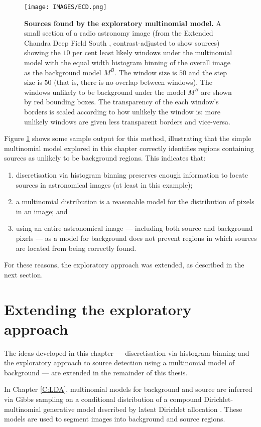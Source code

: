 \begin{figure}
\centering
\texttt{[image: IMAGES/ECD.png]}
\caption[Sources found by the exploratory multinomial model]{\textbf{Sources found by the exploratory multinomial model.} A small section of a radio astronomy image (from the Extended Chandra Deep Field South \cite{miller2013very}, contrast-adjusted to show sources) showing the $10$ per cent least likely windows under the multinomial model with the equal width histogram binning of the overall image as the background model $M^B$. The window size is $50$ and the step size is $50$ (that is, there is no overlap between windows). The windows unlikely to be background under the model $M^B$ are shown by red bounding boxes. The transparency of the each window's borders is scaled according to how unlikely the window is: more unlikely windows are given less transparent borders and vice-versa.}
\label{fig:ECD-mult}
\end{figure}

Figure \ref{fig:ECD-mult} shows some sample output for this method, illustrating that the simple multinomial model explored in this chapter correctly identifies regions containing sources as unlikely to be background regions. This indicates that:
\begin{enumerate}
\item discretisation via histogram binning preserves enough information to locate sources in astronomical images (at least in this example);
\item a multinomial distribution is a reasonable model for the distribution of pixels in an image; and
\item using an entire astronomical image --- including both source and background pixels --- as a model for background does not prevent regions in which sources are located from being correctly found.
\end{enumerate}

For these reasons, the exploratory approach was extended, as described in the next section.

\section{Extending the exploratory approach}
The ideas developed in this chapter --- discretisation via histogram binning and the exploratory approach to source detection using a multinomial model of background --- are extended in the remainder of this thesis. 

In Chapter \ref{C:LDA}, multinomial models for background and source are inferred via Gibbs sampling on a conditional distribution of a compound Dirichlet-multinomial generative model described by latent Dirichlet allocation \cite{blei2003latent}. These models are used to segment images into background and source regions.

